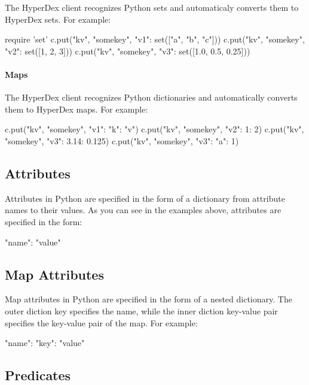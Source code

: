 The HyperDex client recognizes Python sets and automaticaly converts them to
HyperDex sets.  For example:

\begin{pythoncode}
require 'set'
c.put("kv", "somekey", {"v1": set(["a", "b", "c"])})
c.put("kv", "somekey", {"v2": set([1, 2, 3])})
c.put("kv", "somekey", {"v3": set([1.0, 0.5, 0.25])})
\end{pythoncode}

\paragraph{Maps}

The HyperDex client recognizes Python dictionaries and automatically converts them to
HyperDex maps.  For example:

\begin{pythoncode}
c.put("kv", "somekey", {"v1": {"k": "v"}})
c.put("kv", "somekey", {"v2": {1: 2}})
c.put("kv", "somekey", {"v3": {3.14: 0.125}})
c.put("kv", "somekey", {"v3": {"a": 1}})
\end{pythoncode}

\subsection{Attributes}
\label{sec:api:python-client:attributes}

Attributes in Python are specified in the form of a dictionary from attribute names to
their values.  As you can see in the examples above, attributes are specified in
the form:

\begin{pythoncode}
{"name": "value"}
\end{pythoncode}

\subsection{Map Attributes}
\label{sec:api:python-client:map-attributes}

Map attributes in Python are specified in the form of a nested dictionary.  The outer
diction key specifies the name, while the inner diction key-value pair specifies the
key-value pair of the map.  For example:

\begin{pythoncode}
{"name": {"key": "value"}}
\end{pythoncode}

\subsection{Predicates}
\label{sec:api:python-client:predicates}

